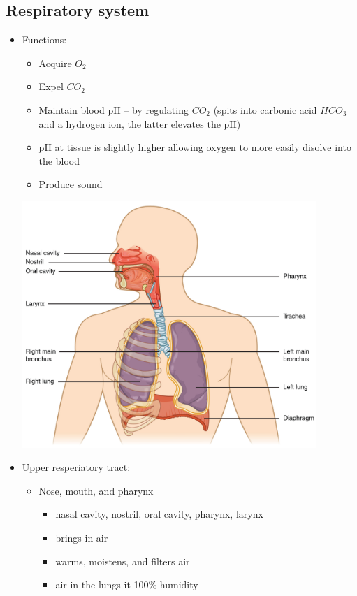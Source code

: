 \documentclass{article}
\theoremstyle{definition}
\begin{document}
\subsection{Respiratory system}
\begin{itemize}
	\item Functions:
		\begin{itemize}
			\item Acquire $O_2$
			\item Expel $CO_2$
			\item Maintain blood pH -- by regulating $CO_2$ (spits into carbonic acid $HCO_3$ and a hydrogen ion, the latter elevates the pH)
			\item pH at tissue is slightly higher allowing oxygen to more easily disolve into the blood
			\item Produce sound
		\end{itemize}
	\begin{center}
		\includegraphics[width=30em]{Respiratory_Organs.jpg}
	\end{center}
	\item Upper resperiatory tract:
		\begin{itemize}
			\item Nose, mouth, and pharynx
				\begin{itemize}
					\item nasal cavity, nostril, oral cavity, pharynx, larynx
					\item brings in air
					\item warms, moistens, and filters air
					\item air in the lungs it 100\% humidity
				\end{itemize}

\end{itemize}
\end{itemize}
\end{document}
